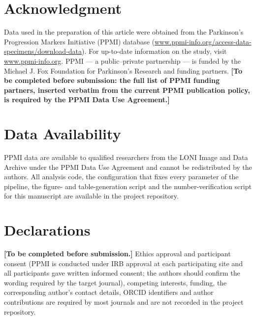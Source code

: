 \documentclass[journal]{IEEEtran}
\begin{document}
\section*{Acknowledgment}

Data used in the preparation of this article were obtained from the Parkinson's
Progression Markers Initiative (PPMI) database
(\url{www.ppmi-info.org/access-data-specimens/download-data}). For up-to-date
information on the study, visit \url{www.ppmi-info.org}. PPMI --- a public--private
partnership --- is funded by the Michael J. Fox Foundation for Parkinson's
Research and funding partners.
\textbf{[To be completed before submission: the full list of PPMI funding
partners, inserted verbatim from the current PPMI publication policy, is
required by the PPMI Data Use Agreement.]}

\section*{Data Availability}
PPMI data are available to qualified researchers from the LONI Image and Data
Archive under the PPMI Data Use Agreement and cannot be redistributed by the
authors. All analysis code, the configuration that fixes every parameter of the
pipeline, the figure- and table-generation script and the number-verification
script for this manuscript are available in the project repository.

\section*{Declarations}
\textbf{[To be completed before submission.]} Ethics approval and participant
consent (PPMI is conducted under IRB approval at each participating site and all
participants gave written informed consent; the authors should confirm the
wording required by the target journal), competing interests, funding, the
corresponding author's contact details, ORCID identifiers and author
contributions are required by most journals and are not recorded in the project
repository.



\end{document}
